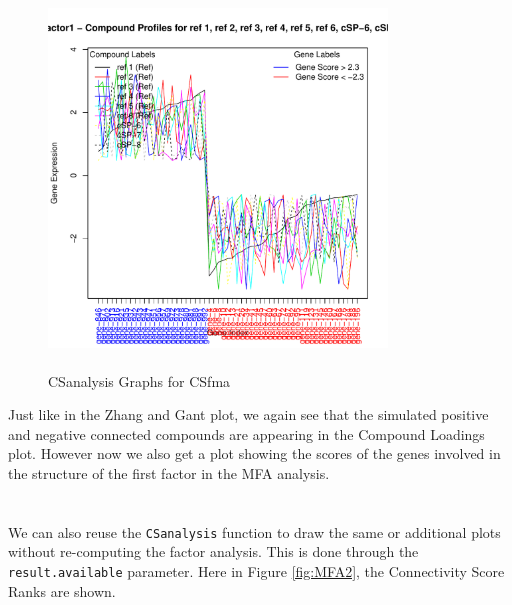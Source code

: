 \documentclass[a4paper]{article}\usepackage[]{graphicx}\usepackage[]{color}
\newenvironment{knitrout}{}{} %
\begin{document}
\begin{knitrout}
\begin{figure}[H]
\includegraphics[width=9cm,height=10cm]{figure/MFA-4} \hfill{}

\caption[CSanalysis Graphs for CSfma]{CSanalysis Graphs for CSfma\label{fig:MFA}}
\end{figure}


\end{knitrout}

\noindent Just like in the Zhang and Gant plot, we again see that the simulated
positive and negative connected compounds are appearing in the Compound Loadings
plot. However now we also get a plot showing the scores of the genes involved in
the structure of the first factor in the MFA analysis.\\
\\ \\
We can also reuse the \texttt{CSanalysis} function to draw the same or
additional plots without re-computing the factor analysis. This is done through the
\texttt{result.available} parameter. Here in Figure \ref{fig:MFA2}, the
Connectivity Score Ranks are shown.
\end{document}
